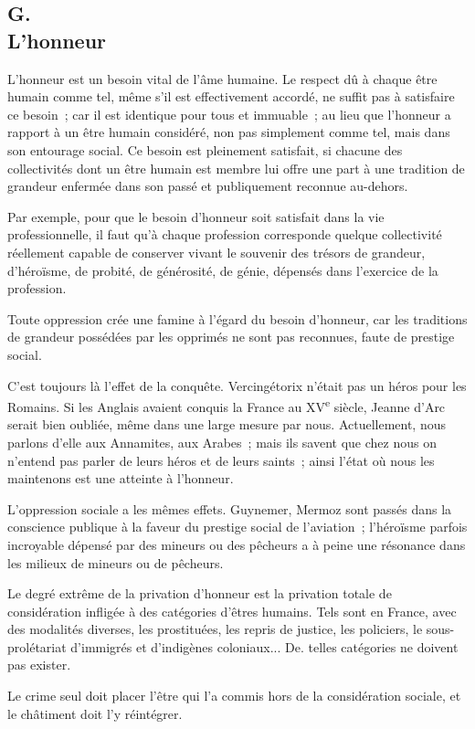 \documentclass[french,twoside]{book} %
\begin{document}
\subsection[G. L’honneur]{G. \\
L’honneur}
\noindent \par
L'honneur est un besoin vital de l'âme humaine. Le respect dû à chaque être humain comme tel, même s'il est effectivement accordé, ne suffit pas à satisfaire ce besoin ; car il est identique pour tous et immuable ; au lieu que l'honneur a rapport à un être humain considéré, non pas simplement comme tel, mais dans son entourage social. Ce besoin est pleinement satisfait, si chacune des collectivités dont un être humain est membre lui offre une part à une tradition de grandeur enfermée dans son passé et publiquement reconnue au-dehors.\par
Par exemple, pour que le besoin d'honneur soit satisfait dans la vie professionnelle, il faut qu'à chaque profession corresponde quelque collectivité réellement capable de conserver vivant le souvenir des trésors de grandeur, d'héroïsme, de probité, de générosité, de génie, dépensés dans l'exercice de la profession.\par
Toute oppression crée une famine à l'égard du besoin d'honneur, car les traditions de grandeur possédées par les opprimés ne sont pas reconnues, faute de prestige social.\par
C'est toujours là l'effet de la conquête. Vercingétorix n'était pas un héros pour les Romains. Si les Anglais avaient conquis la France au XV\textsuperscript{e} siècle, Jeanne d'Arc serait bien oubliée, même dans une large mesure par nous. Actuellement, nous parlons d'elle aux Annamites, aux Arabes ; mais ils savent que chez nous on n'entend pas parler de leurs héros et de leurs saints ; ainsi l'état où nous les maintenons est une atteinte à l'honneur.\par
L'oppression sociale a les mêmes effets. Guynemer, Mermoz sont passés dans la conscience publique à la faveur du prestige social de l'aviation ; l'héroïsme parfois incroyable dépensé par des mineurs ou des pêcheurs a à peine une résonance dans les milieux de mineurs ou de pêcheurs.\par
Le degré extrême de la privation d'honneur est la privation totale de considération infligée à des catégories d'êtres humains. Tels sont en France, avec des modalités diverses, les prostituées, les repris de justice, les policiers, le sous-prolétariat d'immigrés et d'indigènes coloniaux... De. telles catégories ne doivent pas exister.\par
Le crime seul doit placer l'être qui l'a commis hors de la considération sociale, et le châtiment doit l'y réintégrer.
\end{document}
